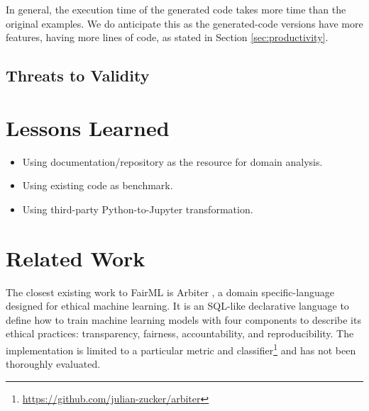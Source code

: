 \documentclass[sigconf,review]{acmart}
\begin{document}
In general, the execution time of the generated code takes more time than the original examples. 
We do anticipate this as the generated-code versions have more features, having more lines of code,
as stated in Section \ref{sec:productivity}. 

\subsection{Threats to Validity}
\label{sec:threats_to_validity}



\section{Lessons Learned}
\label{sec:lessons_learned}

\begin{itemize}
	\item Using documentation/repository as the resource for domain analysis. 
	\item Using existing code as benchmark.
	\item Using third-party Python-to-Jupyter transformation.
\end{itemize}


\section{Related Work}
\label{sec:related_work}

The closest existing work to FairML is Arbiter \cite{zucker2020arbiter}, a domain specific-language designed for ethical machine learning. It is an SQL-like declarative language to define how to train machine learning models with four components to describe its ethical practices: transparency, fairness, accountability, and reproducibility. The implementation is limited to a particular metric and classifier\footnote{\url{https://github.com/julian-zucker/arbiter}} and has not been thoroughly evaluated.
\end{document}
